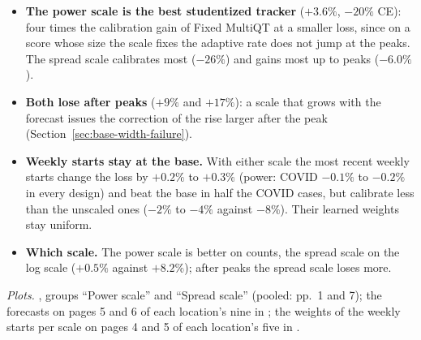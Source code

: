 \documentclass[11pt,a4paper]{article}
\theoremstyle{definition}
\theoremstyle{remark}
\begin{document}
\begin{itemize}[leftmargin=*,itemsep=3pt]
\item \textbf{The power scale is the best studentized tracker} ($+3.6\%$,
$-20\%$ CE): four times the calibration gain of Fixed MultiQT at a smaller
loss, since on a score whose size the scale fixes the adaptive rate does
not jump at the peaks. The spread scale calibrates most ($-26\%$) and gains
most up to peaks ($-6.0\%$).
\item \textbf{Both lose after peaks} ($+9\%$ and $+17\%$): a scale that
grows with the forecast issues the correction of the rise larger after the
peak (Section~\ref{sec:base-width-failure}).
\item \textbf{Weekly starts stay at the base.} With either scale the most
recent weekly starts change the loss by $+0.2\%$ to $+0.3\%$ (power: COVID
$-0.1\%$ to $-0.2\%$ in every design) and beat the base in half the COVID
cases, but calibrate less than the unscaled ones ($-2\%$ to $-4\%$ against
$-8\%$). Their learned weights stay uniform.
\item \textbf{Which scale.} The power scale is better on counts, the spread
scale on the log scale ($+0.5\%$ against $+8.2\%$); after peaks the spread
scale loses more.
\end{itemize}
\emph{Plots.} , groups ``Power scale'' and
``Spread scale'' (pooled: pp.~1 and 7); the forecasts on pages 5 and 6 of
each location's nine in
; the weights of the weekly starts per scale
on pages 4 and 5 of each location's five in .
\end{document}
